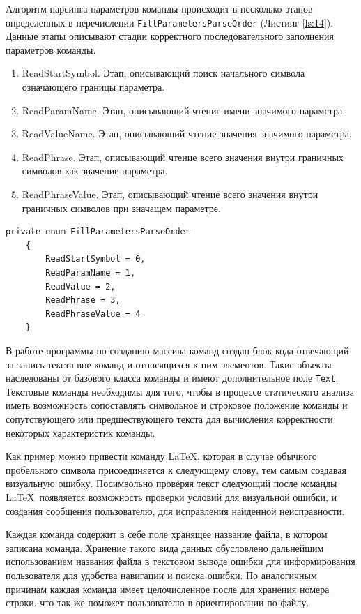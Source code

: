 Алгоритм парсинга параметров команды происходит в несколько этапов определенных в перечислении \verb|FillParametersParseOrder| (Листинг \ref{ls:14}). Данные этапы описывают стадии корректного последовательного заполнения параметров команды. 
\begin{enumerate}
    \item ReadStartSymbol. Этап, описывающий поиск начального символа означающего границы параметра.
    \item ReadParamName. Этап, описывающий чтение имени значимого параметра.
    \item ReadValueName. Этап, описывающий чтение значения значимого параметра.
    \item ReadPhrase. Этап, описывающий чтение всего значения внутри граничных символов как значение параметра.
    \item ReadPhraseValue. Этап, описывающий чтение всего значения внутри граничных символов при значащем параметре.
\end{enumerate}
\begin{lstlisting}[caption={Перечисление этапов парсинга команды}, label={ls:14}]
    private enum FillParametersParseOrder
    {
        ReadStartSymbol = 0,
        ReadParamName = 1,
        ReadValue = 2,
        ReadPhrase = 3,
        ReadPhraseValue = 4
    }
\end{lstlisting}


В работе программы по созданию массива команд создан блок кода отвечающий за запись текста вне команд и относящихся к ним элементов. Такие объекты наследованы от базового класса команды и имеют дополнительное поле \verb|Text|. Текстовые команды необходимы для того, чтобы в процессе статического анализа иметь возможность сопоставлять символьное и строковое положение команды и сопутствующего или предшествующего текста для вычисления корректности некоторых характеристик команды.

Как пример можно привести команду \LaTeX, которая в случае обычного пробельного символа присоединяется к следующему слову, тем самым создавая визуальную ошибку. Посимвольно проверяя текст следующий после команды \LaTeX \ появляется возможность проверки условий для визуальной ошибки, и создания сообщения пользователю, для исправления найденной неисправности.

Каждая команда содержит в себе поле хранящее название файла, в котором записана команда. Хранение такого вида данных обусловлено дальнейшим использованием названия файла в текстовом выводе ошибки для информирования пользователя для удобства навигации и поиска ошибки. По аналогичным причинам каждая команда имеет целочисленное после для хранения номера строки, что так же поможет пользователю в ориентировании по файлу.


